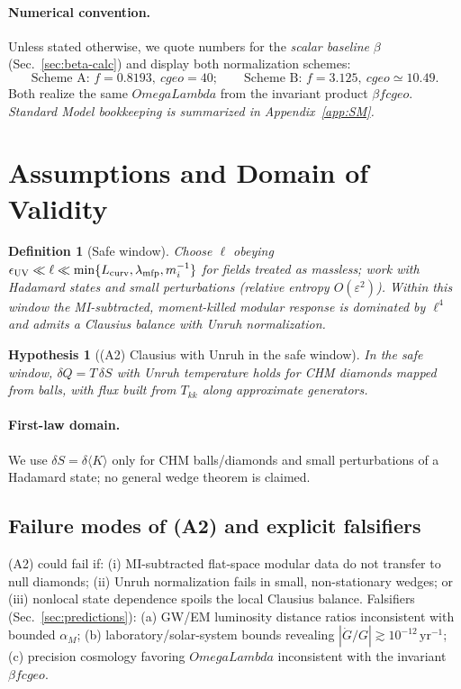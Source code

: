 \documentclass[aps,prd,onecolumn,superscriptaddress,nofootinbib]{revtex4-2}
\def\OmL{OmegaLambda}%
\def\cgeo{cgeo}%
\newcommand{\OmL}{\Omega_\Lambda}
\newcommand{\cgeo}{c_{\rm geo}}
\newtheorem{definition}{Definition}
\newtheorem{hypothesis}{Hypothesis}
\begin{document}
\paragraph*{Numerical convention.}
Unless stated otherwise, we quote numbers for the \emph{scalar baseline} \(\beta\) (Sec.~\ref{sec:beta-calc}) and display both normalization schemes:
\[
\text{Scheme A: } f=0.8193,\ \cgeo=40;\qquad
\text{Scheme B: } f=3.125,\ \cgeo\simeq 10.49.
\]
Both realize the same \(\OmL\) from the invariant product \(\beta f \cgeo\). \emph{Standard Model bookkeeping is summarized in Appendix~\ref{app:SM}.}

\section{Assumptions and Domain of Validity}
\label{sec:assumptions}

\begin{definition}[Safe window]
\label{def:safe-window}
Choose \(\ell\) obeying \(\epsilon_{\rm UV}\ll \ell \ll \min\{L_{\rm curv},\lambda_{\rm mfp},m_i^{-1}\}\) for fields treated as massless; work with Hadamard states and small perturbations (relative entropy \(O(\varepsilon^2)\)). Within this window the MI-subtracted, moment-killed modular response is dominated by \(\ell^4\) and admits a Clausius balance with Unruh normalization.
\end{definition}

\begin{hypothesis}[(A2) Clausius with Unruh in the safe window]
\label{hyp:A2}
In the safe window, \(\delta Q=T\,\delta S\) with Unruh temperature holds for CHM diamonds mapped from balls, with flux built from \(T_{kk}\) along approximate generators.
\end{hypothesis}

\paragraph{First-law domain.} We use \(\delta S=\delta\!\langle K\rangle\) only for CHM balls/diamonds and small perturbations of a Hadamard state; no general wedge theorem is claimed.

\subsection{Failure modes of (A2) and explicit falsifiers}
\label{sec:a2-fail}
(A2) could fail if: (i) MI-subtracted flat-space modular data do not transfer to null diamonds; (ii) Unruh normalization fails in small, non-stationary wedges; or (iii) nonlocal state dependence spoils the local Clausius balance. Falsifiers (Sec.~\ref{sec:predictions}): (a) GW/EM luminosity distance ratios inconsistent with bounded \(\alpha_M\); (b) laboratory/solar-system bounds revealing \(|\dot G/G|\gtrsim 10^{-12}\,\text{yr}^{-1}\); (c) precision cosmology favoring \(\OmL\) inconsistent with the invariant \(\beta f \cgeo\).
\end{document}

